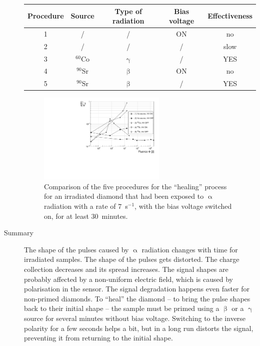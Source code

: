 \begin{description}
\begin{footnotesize}
\begin{center}
\begin{tabular}{   c  c  c  c c }
\hline
Procedure & Source & Type of radiation & Bias voltage & Effectiveness \\
\hline
1 & /                   & /                 & ON    & no \\
2 & /                   & /                 & /        & slow \\
3 & $^{60}$Co   & $\upgamma$ &/         & YES \\
4 & $^{90}$Sr    & $\upbeta$      & ON    & no \\
5 & $^{90}$Sr    & $\upbeta$      & /         & YES \\
\hline
\end{tabular}
\label{tab:healing}
\end{center}
\end{footnotesize}

\begin{figure}[!t]
\begin{center}
\includegraphics[width=0.6\textwidth]{03_measurement_results/scripts/plots/plotLifetime/formCorrelation}
\caption{Comparison of the five procedures for the ``healing'' process for an irradiated diamond that had been exposed to $\upalpha$ radiation with a rate of $7$~s$^{-1}$, with the bias voltage switched on, for at least 30~minutes.}
\label{fig:formCorr}
\end{center}
\end{figure}


\item[Summary] The shape of the pulses caused by $\upalpha$ radiation changes with time for irradiated samples. The shape of the pulses gets distorted. The charge collection decreases and its spread increases. The signal shapes are probably affected by a non-uniform electric field, which is caused by polarisation in the sensor. The signal degradation happens even faster for non-primed diamonds. To ``heal'' the diamond -- to bring the pulse shapes back to their initial shape -- the sample must be primed using a $\upbeta$ or a $\upgamma$ source for several minutes without bias voltage. Switching to the inverse polarity for a few seconds helps a bit, but in a long run distorts the signal, preventing it from returning to the initial shape.
\end{description}
